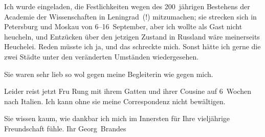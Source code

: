 \pstart
           Ich wurde eingeladen, die Festlichkeiten wegen des 200 jährigen Bestehens der Academie der Wissenschaften in Leningrad (!) mitzumachen; sie strecken sich in Petersburg und Moskau von 6–16 September, aber ich wollte als
               Gast nicht heucheln, und Entzücken über den {\pb}jetzigen Zustand in Russland wäre meinerseits Heuchelei. Reden
               müsste ich ja, und das schreckte mich. Sonst hätte ich gerne die zwei Städte unter den
               veränderten Umständen wiedergesehen.\pend
           
\pstart
           Sie waren sehr lieb so wol gegen meine Begleiterin wie gegen mich.\pend
           
\pstart
           Leider reist jetzt Fru Rung mit ihrem Gatten und ihrer Cousine auf 6 Wochen nach Italien. Ich kann ohne sie meine Correspondenz
               nicht bewältigen.\pend
           
\pstart
           Sie wissen kaum, wie dankbar ich mich im Innersten für Ihre vieljährige Freundschaft
               fühle.\pend
           \pstart Ihr \spacefill\mbox{Georg Brandes}\pend{}\endnumbering{}  \newcommand{\dateiname}{L02443}\newcommand{\titel}{Georg Brandes an Arthur Schnitzler, 21. 6. 1925}\newcommand{\editorInnen}{Martin Anton Müller und Gerd-Hermann Susen}
